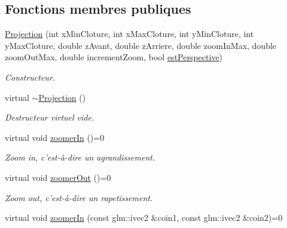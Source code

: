\subsection*{Fonctions membres publiques}
\begin{DoxyCompactItemize}
\item 
\hyperlink{classvue_1_1_projection_a27549dbc8ece7f5fdb3f7cd5d7a66fad}{Projection} (int x\-Min\-Cloture, int x\-Max\-Cloture, int y\-Min\-Cloture, int y\-Max\-Cloture, double z\-Avant, double z\-Arriere, double zoom\-In\-Max, double zoom\-Out\-Max, double increment\-Zoom, bool \hyperlink{classvue_1_1_projection_a3d9b70124ec0b3ed22299158abc4067c}{est\-Perspective})
\begin{DoxyCompactList}\small\item\em Constructeur. \end{DoxyCompactList}\item 
\hypertarget{classvue_1_1_projection_acb6551eb343f0b522c4994022a85b570}{virtual \hyperlink{classvue_1_1_projection_acb6551eb343f0b522c4994022a85b570}{$\sim$\-Projection} ()}\label{classvue_1_1_projection_acb6551eb343f0b522c4994022a85b570}

\begin{DoxyCompactList}\small\item\em Destructeur virtuel vide. \end{DoxyCompactList}\item 
\hypertarget{classvue_1_1_projection_ac3cd77fd93595b6844bd1b3b66867f55}{virtual void \hyperlink{classvue_1_1_projection_ac3cd77fd93595b6844bd1b3b66867f55}{zoomer\-In} ()=0}\label{classvue_1_1_projection_ac3cd77fd93595b6844bd1b3b66867f55}

\begin{DoxyCompactList}\small\item\em Zoom in, c'est-\/à-\/dire un agrandissement. \end{DoxyCompactList}\item 
\hypertarget{classvue_1_1_projection_a2f411375817ca560d31a66f2da5e51eb}{virtual void \hyperlink{classvue_1_1_projection_a2f411375817ca560d31a66f2da5e51eb}{zoomer\-Out} ()=0}\label{classvue_1_1_projection_a2f411375817ca560d31a66f2da5e51eb}

\begin{DoxyCompactList}\small\item\em Zoom out, c'est-\/à-\/dire un rapetissement. \end{DoxyCompactList}\item 
\hypertarget{classvue_1_1_projection_af6b1f66bfaa027815d9e7e7e6821ee8b}{virtual void \hyperlink{classvue_1_1_projection_af6b1f66bfaa027815d9e7e7e6821ee8b}{zoomer\-In} (const glm\-::ivec2 \&coin1, const glm\-::ivec2 \&coin2)=0}\label{classvue_1_1_projection_af6b1f66bfaa027815d9e7e7e6821ee8b}


\end{DoxyCompactItemize}

